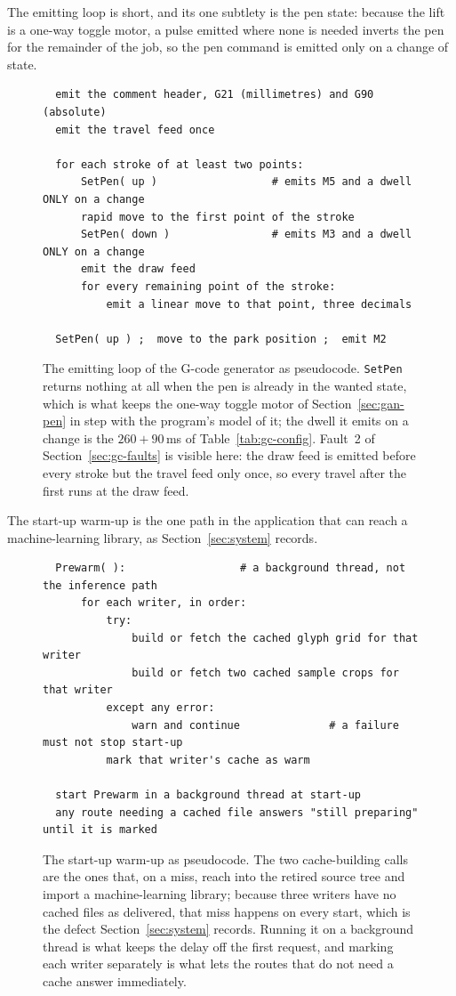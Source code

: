 The emitting loop is short, and its one subtlety is the pen state: because the lift is a one-way toggle motor, a pulse emitted where none is needed inverts the pen for the remainder of the job, so the pen command is emitted only on a change of state.

\begin{figure}[!htbp]
\centering
\fontsize{8.5}{10.2}\selectfont
\begin{verbatim}
  emit the comment header, G21 (millimetres) and G90 (absolute)
  emit the travel feed once

  for each stroke of at least two points:
      SetPen( up )                  # emits M5 and a dwell ONLY on a change
      rapid move to the first point of the stroke
      SetPen( down )                # emits M3 and a dwell ONLY on a change
      emit the draw feed
      for every remaining point of the stroke:
          emit a linear move to that point, three decimals

  SetPen( up ) ;  move to the park position ;  emit M2
\end{verbatim}
\caption{The emitting loop of the G-code generator as pseudocode. \texttt{SetPen} returns nothing at all when the pen is already in the wanted state, which is what keeps the one-way toggle motor of Section~\ref{sec:gan-pen} in step with the program's model of it; the dwell it emits on a change is the $260+90$\,ms of Table~\ref{tab:gc-config}. Fault~2 of Section~\ref{sec:gc-faults} is visible here: the draw feed is emitted before every stroke but the travel feed only once, so every travel after the first runs at the draw feed.}
\label{fig:gc-emitpseudo}
\end{figure}

The start-up warm-up is the one path in the application that can reach a machine-learning library, as Section~\ref{sec:system} records.

\begin{figure}[!htbp]
\centering
\fontsize{8.5}{10.2}\selectfont
\begin{verbatim}
  Prewarm( ):                  # a background thread, not the inference path
      for each writer, in order:
          try:
              build or fetch the cached glyph grid for that writer
              build or fetch two cached sample crops for that writer
          except any error:
              warn and continue              # a failure must not stop start-up
          mark that writer's cache as warm

  start Prewarm in a background thread at start-up
  any route needing a cached file answers "still preparing" until it is marked
\end{verbatim}
\caption{The start-up warm-up as pseudocode. The two cache-building calls are the ones that, on a miss, reach into the retired source tree and import a machine-learning library; because three writers have no cached files as delivered, that miss happens on every start, which is the defect Section~\ref{sec:system} records. Running it on a background thread is what keeps the delay off the first request, and marking each writer separately is what lets the routes that do not need a cache answer immediately.}
\label{fig:sys-code-warm}
\end{figure}

